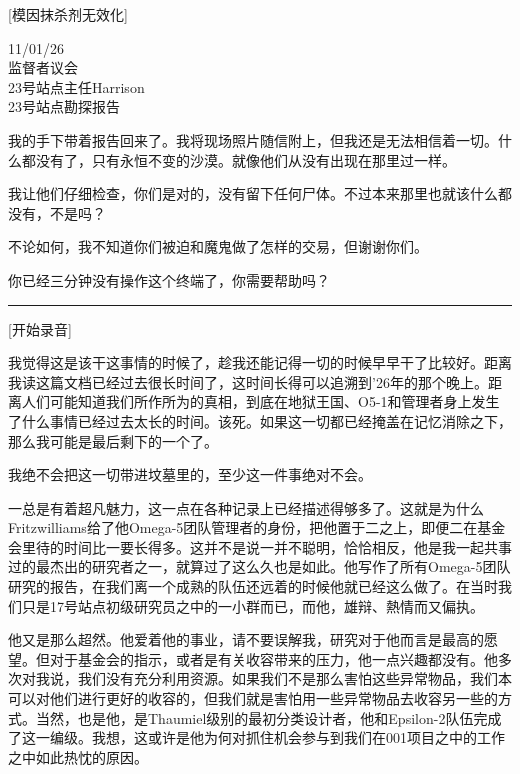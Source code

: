 \begin{scpboxc}
{[模因抹杀剂无效化]}
\end{scpboxc}

\begin{scpbox}

11/01/26 \\
监督者议会 \\
23号站点主任Harrison \\
23号站点勘探报告

我的手下带着报告回来了。我将现场照片随信附上，但我还是无法相信着一切。什么都没有了，只有永恒不变的沙漠。就像他们从没有出现在那里过一样。

我让他们仔细检查，你们是对的，没有留下任何尸体。不过本来那里也就该什么都没有，不是吗？

不论如何，我不知道你们被迫和魔鬼做了怎样的交易，但谢谢你们。


\end{scpbox}

\hr


\begin{scpboxc}
你已经三分钟没有操作这个终端了，你需要帮助吗？
\end{scpboxc}


\hrule



[开始录音]

我觉得这是该干这事情的时候了，趁我还能记得一切的时候早早干了比较好。距离我读这篇文档已经过去很长时间了，这时间长得可以追溯到'26年的那个晚上。距离人们可能知道我们所作所为的真相，到底在地狱王国、O5-1和管理者身上发生了什么事情已经过去太长的时间。该死。如果这一切都已经掩盖在记忆消除之下，那么我可能是最后剩下的一个了。

我绝不会把这一切带进坟墓里的，至少这一件事绝对不会。

一总是有着超凡魅力，这一点在各种记录上已经描述得够多了。这就是为什么Fritzwilliams给了他Omega-5团队管理者的身份，把他置于二之上，即便二在基金会里待的时间比一要长得多。这并不是说一并不聪明，恰恰相反，他是我一起共事过的最杰出的研究者之一，就算过了这么久也是如此。他写作了所有Omega-5团队研究的报告，在我们离一个成熟的队伍还远着的时候他就已经这么做了。在当时我们只是17号站点初级研究员之中的一小群而已，而他，雄辩、熱情而又偏执。

他又是那么超然。他爱着他的事业，请不要误解我，研究对于他而言是最高的愿望。但对于基金会的指示，或者是有关收容带来的压力，他一点兴趣都没有。他多次对我说，我们没有充分利用资源。如果我们不是那么害怕这些异常物品，我们本可以对他们进行更好的收容的，但我们就是害怕用一些异常物品去收容另一些的方式。当然，也是他，是Thaumiel级别的最初分类设计者，他和Epsilon-2队伍完成了这一编级。我想，这或许是他为何对抓住机会参与到我们在001项目之中的工作之中如此热忱的原因。

